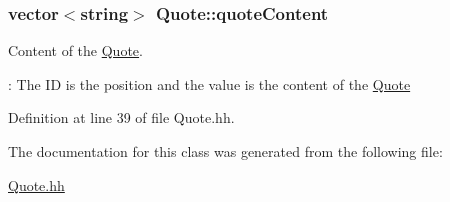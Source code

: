 \subsubsection[{\texorpdfstring{quote\+Content}{quoteContent}}]{\setlength{\rightskip}{0pt plus 5cm}vector$<$string$>$ Quote\+::quote\+Content\hspace{0.3cm}{\ttfamily [private]}}\hypertarget{class_quote_a0ffcb584920e14d7dd5c45820997f989}{}\label{class_quote_a0ffcb584920e14d7dd5c45820997f989}


Content of the \hyperlink{class_quote}{Quote}. 

\+: The ID is the position and the value is the content of the \hyperlink{class_quote}{Quote} 

Definition at line 39 of file Quote.\+hh.



The documentation for this class was generated from the following file\+:\begin{DoxyCompactItemize}
\item 
\hyperlink{_quote_8hh}{Quote.\+hh}\end{DoxyCompactItemize}

